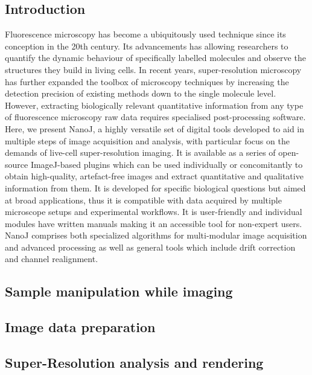 \subsection*{Introduction}
  Fluorescence microscopy has become a ubiquitously used technique since its conception in the 20th century. Its advancements has allowing researchers to quantify the dynamic behaviour of specifically labelled molecules and observe the structures they build in living cells. In recent years, super-resolution microscopy has further expanded the toolbox of microscopy techniques by increasing the detection precision of existing methods down to the single molecule level. However, extracting biologically relevant quantitative information from any type of fluorescence microscopy raw data requires specialised post-processing software.
  Here, we present NanoJ, a highly versatile set of digital tools developed to aid in multiple steps of image acquisition and analysis, with particular focus on the demands of live-cell super-resolution imaging. It is available as a series of open-source ImageJ-based plugins which can be used individually or concomitantly to obtain high-quality, artefact-free images and extract quantitative and qualitative information from them. It is developed for specific biological questions but aimed at broad applications, thus it is compatible with data acquired by multiple microscope setups and experimental workflows. It is user-friendly and individual modules have written manuals making it an accessible tool for non-expert users.
  NanoJ comprises both specialized algorithms for multi-modular image acquisition and advanced processing as well as general tools which include drift correction and channel realignment.
  
\subsection*{Sample manipulation while imaging}
\Blindtext

\subsection*{Image data preparation}
\Blindtext

\subsection*{Super-Resolution analysis and rendering}
\Blindtext

